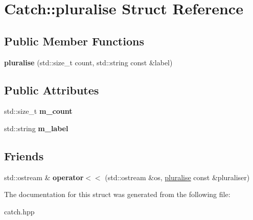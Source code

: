 \hypertarget{structCatch_1_1pluralise}{
\section{Catch::pluralise Struct Reference}
\label{structCatch_1_1pluralise}
}
\subsection*{Public Member Functions}
\begin{DoxyCompactItemize}
\item 
\hypertarget{structCatch_1_1pluralise_a5c55e22de2416cfe416edf715c6b9234}{
{\bfseries pluralise} (std::size\_\-t count, std::string const \&label)}
\label{structCatch_1_1pluralise_a5c55e22de2416cfe416edf715c6b9234}

\end{DoxyCompactItemize}
\subsection*{Public Attributes}
\begin{DoxyCompactItemize}
\item 
\hypertarget{structCatch_1_1pluralise_a4dce2fa13ec6f00fac09b2418265441e}{
std::size\_\-t {\bfseries m\_\-count}}
\label{structCatch_1_1pluralise_a4dce2fa13ec6f00fac09b2418265441e}

\item 
\hypertarget{structCatch_1_1pluralise_a8849cbdd3f11ebe7747597c8644e8793}{
std::string {\bfseries m\_\-label}}
\label{structCatch_1_1pluralise_a8849cbdd3f11ebe7747597c8644e8793}

\end{DoxyCompactItemize}
\subsection*{Friends}
\begin{DoxyCompactItemize}
\item 
\hypertarget{structCatch_1_1pluralise_aa7dac6b165514c1f85e0695d678fdef5}{
std::ostream \& {\bfseries operator$<$$<$} (std::ostream \&os, \hyperlink{structCatch_1_1pluralise}{pluralise} const \&pluraliser)}
\label{structCatch_1_1pluralise_aa7dac6b165514c1f85e0695d678fdef5}

\end{DoxyCompactItemize}


The documentation for this struct was generated from the following file:\begin{DoxyCompactItemize}
\item 
catch.hpp\end{DoxyCompactItemize}
